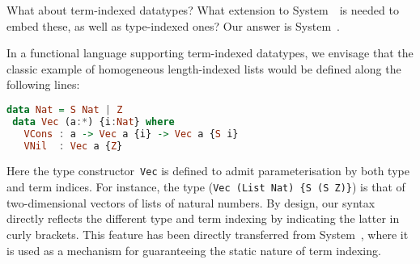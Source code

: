 What about term-indexed datatypes?  What extension to System~\Fw\ is
needed to embed these, as well as type-indexed ones?  Our answer is
System~\Fi.

In a functional language supporting term-indexed datatypes, we envisage
that the classic example of homogeneous length-indexed lists would be
defined along the following lines:
\begin{lstlisting}[basicstyle={\ttfamily},language=Haskell]
 data Nat = S Nat | Z 
 data Vec (a:*) {i:Nat} where
   VCons : a -> Vec a {i} -> Vec a {S i}
   VNil  : Vec a {Z}
\end{lstlisting}\noindent
Here the type constructor~{\tt Vec} is defined to admit parameterisation
by both type and term indices.  For instance, the type 
(\verb|Vec (List Nat) {S (S Z)}|) is that of two-dimensional
vectors of lists of natural numbers.  By design, our syntax directly
reflects the different type and term indexing by indicating the latter in
curly brackets.  This feature has been directly transferred from
System~\Fi, where it is used as a mechanism for guaranteeing the static
nature of term indexing.

